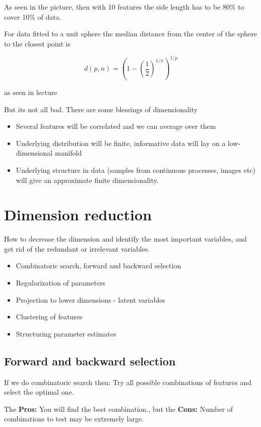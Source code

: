 As seen in the picture, then with 10 features the side length has to be 80\% to cover 10\% of data.

For data fitted to a unit sphere the median distance from the center of
the sphere to the closest point is

\[
    d(p, n) = \left( 1- \left( \frac{1}{2}\right)^{1/n}\right)^{1/p}
\]

as seen in lecture \cite[p.~11]{lecture3}

But its not all bad. There are some blessings of dimensionality

\begin{itemize}
  \item Several features will be correlated and we can average over them
  \item Underlying distribution will be finite, informative data will lay on a low-dimensional manifold
  \item Underlying structure in data (samples from continuous processes, images etc) will give an approximate finite dimensionality.
\end{itemize}

\section{Dimension reduction}

How to decrease the dimension and identify the most important
variables, and get rid of the redundant or irrelevant variables.

\begin{itemize}
  \item Combinatoric search, forward and backward selection
  \item Regularization of parameters
  \item Projection to lower dimensions - latent variables
  \item Clustering of features
  \item Structuring parameter estimates
\end{itemize}

\subsection{Forward and backward selection}

If we do combinatoric search then: Try all possible combinations of features and select the optimal one.

The \textbf{Pros:} You will find the best combination., but the \textbf{Cons:} Number of combinations to test may be extremely large.

